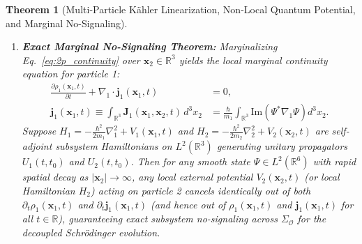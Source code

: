 \documentclass[11pt, a4paper]{article}
\newtheorem{theorem}{Theorem}[section]
\theoremstyle{definition}
\begin{document}
\begin{theorem}[Multi-Particle K\"{a}hler Linearization, Non-Local Quantum Potential, and Marginal No-Signaling]
\begin{enumerate}[label=(\roman*)]
\begin{align}
    \frac{\partial \tilde{S}_{12}}{\partial t} + \frac{|\nabla_1 \tilde{S}_{12}|^2}{2m_1} + \frac{|\nabla_2 \tilde{S}_{12}|^2}{2m_2} &+ V_1 + V_2 + Q_{12}(\mathbf{x}_1, \mathbf{x}_2, t) = 0, \label{eq:2p_HJB}
    \end{align}
    for $a = 1, 2$, where the functional derivative $Q_{12} \equiv \delta \mathcal{F}_{12} / \delta \rho_{12}$ is the non-local Bohm quantum potential:
    \begin{equation}
    \label{eq:Q12_bohm}
    Q_{12}(\mathbf{x}_1, \mathbf{x}_2, t) = -\frac{\hbar^2}{2m_1}\frac{\nabla_1^2 \sqrt{\rho_{12}}}{\sqrt{\rho_{12}}} - \frac{\hbar^2}{2m_2}\frac{\nabla_2^2 \sqrt{\rho_{12}}}{\sqrt{\rho_{12}}},
    \end{equation}
    which decomposes into a sum $Q_1(\mathbf{x}_1) + Q_2(\mathbf{x}_2)$ whenever the joint density factorizes ($\mathcal{E}_{\text{ent}}[\rho_{12}] = 0$).
    \item \textbf{Exact Marginal No-Signaling Theorem:} Marginalizing Eq.~\eqref{eq:2p_continuity} over $\mathbf{x}_2 \in \mathbb{R}^3$ yields the local marginal continuity equation for particle 1:
    \begin{equation}
    \label{eq:marginal_continuity}
    \begin{aligned}
    \frac{\partial \rho_1(\mathbf{x}_1, t)}{\partial t} + \nabla_1 \cdot \mathbf{j}_1(\mathbf{x}_1, t) &= 0, \\
    \mathbf{j}_1(\mathbf{x}_1, t) \equiv \int_{\mathbb{R}^3} \mathbf{J}_1(\mathbf{x}_1, \mathbf{x}_2, t)\,d^3x_2 &= \frac{\hbar}{m_1}\int_{\mathbb{R}^3} \text{Im}\left(\Psi^* \nabla_1 \Psi\right) d^3x_2.
    \end{aligned}
    \end{equation}
    Suppose $H_1 = -\frac{\hbar^2}{2m_1}\nabla_1^2 + V_1(\mathbf{x}_1, t)$ and $H_2 = -\frac{\hbar^2}{2m_2}\nabla_2^2 + V_2(\mathbf{x}_2, t)$ are self-adjoint subsystem Hamiltonians on $L^2(\mathbb{R}^3)$ generating unitary propagators $U_1(t, t_0)$ and $U_2(t, t_0)$. Then for any smooth state $\Psi \in L^2(\mathbb{R}^6)$ with rapid spatial decay as $|\mathbf{x}_2| \to \infty$, any local external potential $V_2(\mathbf{x}_2, t)$ (or local Hamiltonian $H_2$) acting on particle 2 cancels identically out of both $\partial_t \rho_1(\mathbf{x}_1, t)$ and $\partial_t \mathbf{j}_1(\mathbf{x}_1, t)$ (and hence out of $\rho_1(\mathbf{x}_1, t)$ and $\mathbf{j}_1(\mathbf{x}_1, t)$ for all $t \in \mathbb{R}$), guaranteeing exact subsystem no-signaling across $\Sigma_{\mathcal{O}}$ for the decoupled Schr\"{o}dinger evolution.
\end{enumerate}
\end{theorem}
\end{document}
